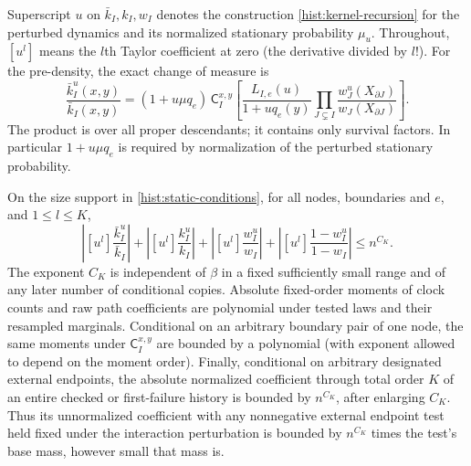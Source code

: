 Superscript $u$ on $\bar k_I,k_I,w_I$ denotes the construction
\eqref{hist:kernel-recursion} for the perturbed dynamics and its normalized
stationary probability $\mu_u$.  Throughout, $[u^l]$ means the $l$th Taylor
coefficient at zero (the derivative divided by $l!$).  For the pre-density,
the exact change of measure is
\begin{equation}\label{hist:pre-ratio}
 \frac{\bar k_I^u(x,y)}{\bar k_I(x,y)}
 = (1+u\mu q_e)\,
 \mathsf C_I^{x,y}\left[
    \frac{L_{I,e}(u)}{1+u q_e(y)}
      \prod_{J\subsetneq I}\frac{w_J^u(X_{\partial J})}{w_J(X_{\partial J})}
                         \right].
\end{equation}
The product is over all proper descendants; it contains only survival
factors.  In particular $1+u\mu q_e$ is required by normalization of the
perturbed stationary probability.

\begin{lemma}\label{hist:crude-ratios}
On the size support in \eqref{hist:static-conditions}, for all nodes,
boundaries and $e$, and $1\le l\le K$,
\[
 \left|[u^l]\frac{\bar k_I^u}{\bar k_I}\right|
 +\left|[u^l]\frac{k_I^u}{k_I}\right|
 +\left|[u^l]\frac{w_I^u}{w_I}\right|
 +\left|[u^l]\frac{1-w_I^u}{1-w_I}\right|\le n^{C_K}.
\]
The exponent $C_K$ is independent of $\beta$ in a fixed sufficiently small
range and of any later number of conditional copies.  Absolute fixed-order
moments of clock counts and raw path coefficients are polynomial under
tested laws and their resampled marginals.  Conditional on an arbitrary
boundary pair of one node, the same moments under $\mathsf C_I^{x,y}$ are
bounded by a polynomial (with exponent allowed to depend on the moment
order).  Finally, conditional on arbitrary designated external endpoints,
the absolute normalized coefficient through total order $K$ of an entire
checked or first-failure history is bounded by $n^{C_K}$, after enlarging
$C_K$.  Thus its unnormalized coefficient with any nonnegative external
endpoint test held fixed under the interaction perturbation is bounded by
$n^{C_K}$ times the test's base mass, however
small that mass is.
\end{lemma}

